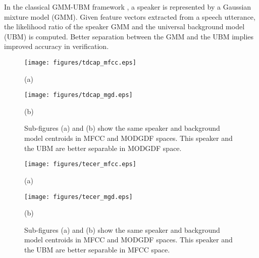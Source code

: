 \documentclass{article}
\begin{document}
In the classical GMM-UBM framework \cite{reynoldsAdaptedGMM}, a speaker is
represented by a Gaussian mixture model (GMM). Given feature vectors extracted
from a speech utterance, the likelihood ratio of the speaker GMM and the
universal background model (UBM) is computed. Better separation between the GMM
and the UBM implies improved accuracy in verification.

\begin{figure}[h]
\centering 
\begin{minipage}[c]{0.5\textwidth}
\centering 
    \texttt{[image: figures/tdcap\_mfcc.eps]}
	\caption*{(a)}
\end{minipage}%
\begin{minipage}[c]{0.35\textwidth}
\centering  
    \texttt{[image: figures/tdcap\_mgd.eps]}
	\caption*{(b)}
\end{minipage}
\caption{Sub-figures (a) and (b) show the same speaker and background model centroids in MFCC and MODGDF spaces. This speaker and the UBM are better separable in 
MODGDF space.}
\label{fig:ubm_sep1}
\end{figure}

\begin{figure}[h]
\centering 
\begin{minipage}[c]{0.45\textwidth}
\centering 
    \texttt{[image: figures/tecer\_mfcc.eps]}
	\caption*{(a)}
\end{minipage}%
\begin{minipage}[c]{0.45\textwidth}
\centering  
    \texttt{[image: figures/tecer\_mgd.eps]}
	\caption*{(b)}
\end{minipage}
\caption{Sub-figures (a) and (b) show the same speaker and background model centroids in MFCC and MODGDF spaces. This speaker and the UBM are better separable in 
MFCC space.}
\label{fig:ubm_sep2}
\end{figure}
\end{document}
